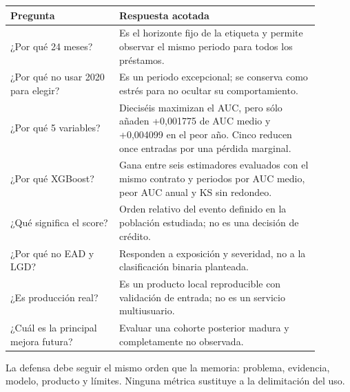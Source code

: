 \documentclass[10pt,a4paper]{article}
\newcommand{\SelectedFamily}{XGBoost}
\newcommand{\SelectedK}{5}
\newcommand{\DeltaFiveAUC}{+0,001775}
\newcommand{\DeltaFiveWorst}{+0,004099}
\begin{document}
\begin{center}\small
\begin{tabular}{p{0.31\linewidth} p{0.58\linewidth}}
\textbf{Pregunta} & \textbf{Respuesta acotada}\\ \hline
¿Por qué 24 meses? & Es el horizonte fijo de la etiqueta y permite observar el mismo periodo para todos los préstamos.\\
¿Por qué no usar 2020 para elegir? & Es un periodo excepcional; se conserva como estrés para no ocultar su comportamiento.\\
¿Por qué \SelectedK{} variables? & Dieciséis maximizan el AUC, pero sólo añaden \DeltaFiveAUC{} de AUC medio y \DeltaFiveWorst{} en el peor año. Cinco reducen once entradas por una pérdida marginal.\\
¿Por qué \SelectedFamily{}? & Gana entre seis estimadores evaluados con el mismo contrato y periodos por AUC medio, peor AUC anual y KS sin redondeo.\\
¿Qué significa el score? & Orden relativo del evento definido en la población estudiada; no es una decisión de crédito.\\
¿Por qué no EAD y LGD? & Responden a exposición y severidad, no a la clasificación binaria planteada.\\
¿Es producción real? & Es un producto local reproducible con validación de entrada; no es un servicio multiusuario.\\
¿Cuál es la principal mejora futura? & Evaluar una cohorte posterior madura y completamente no observada.\\
\end{tabular}
\end{center}

La defensa debe seguir el mismo orden que la memoria: problema, evidencia,
modelo, producto y límites. Ninguna métrica sustituye a la delimitación del uso.
\end{document}
